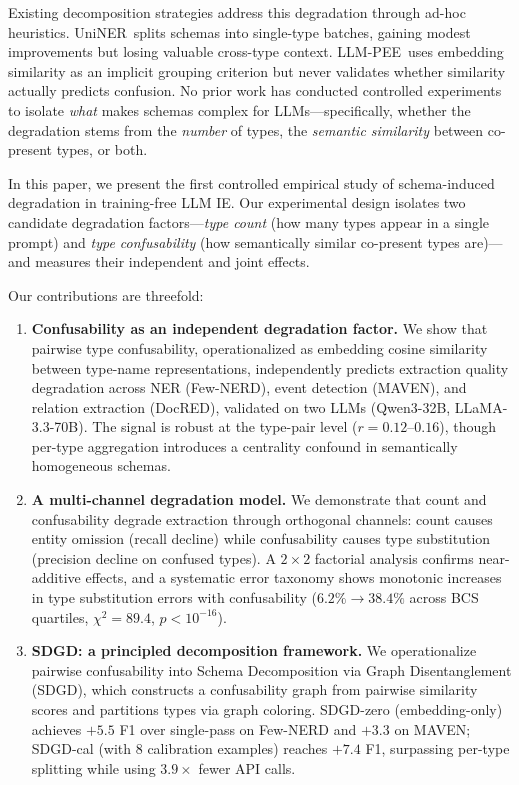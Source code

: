 \documentclass[11pt,a4paper]{article}
\begin{document}
Existing decomposition strategies address this degradation through ad-hoc heuristics.
UniNER~splits schemas into single-type batches, gaining modest improvements but losing valuable cross-type context.
LLM-PEE~uses embedding similarity as an implicit grouping criterion but never validates whether similarity actually predicts confusion.
No prior work has conducted controlled experiments to isolate \emph{what} makes schemas complex for LLMs---specifically, whether the degradation stems from the \emph{number} of types, the \emph{semantic similarity} between co-present types, or both.

In this paper, we present the first controlled empirical study of schema-induced degradation in training-free LLM IE.
Our experimental design isolates two candidate degradation factors---\emph{type count} (how many types appear in a single prompt) and \emph{type confusability} (how semantically similar co-present types are)---and measures their independent and joint effects.

Our contributions are threefold:
\begin{enumerate}
\item \textbf{Confusability as an independent degradation factor.}
We show that pairwise type confusability, operationalized as embedding cosine similarity between type-name representations, independently predicts extraction quality degradation across NER (Few-NERD), event detection (MAVEN), and relation extraction (DocRED), validated on two LLMs (Qwen3-32B, LLaMA-3.3-70B).
The signal is robust at the type-pair level ($r{=}0.12$--$0.16$), though per-type aggregation introduces a centrality confound in semantically homogeneous schemas.

\item \textbf{A multi-channel degradation model.}
We demonstrate that count and confusability degrade extraction through orthogonal channels: count causes entity omission (recall decline) while confusability causes type substitution (precision decline on confused types).
A $2{\times}2$ factorial analysis confirms near-additive effects, and a systematic error taxonomy shows monotonic increases in type substitution errors with confusability ($6.2\%{\to}38.4\%$ across BCS quartiles, $\chi^2{=}89.4$, $p{<}10^{-16}$).

\item \textbf{SDGD: a principled decomposition framework.}
We operationalize pairwise confusability into Schema Decomposition via Graph Disentanglement (SDGD), which constructs a confusability graph from pairwise similarity scores and partitions types via graph coloring.
SDGD-zero (embedding-only) achieves $+5.5$ F1 over single-pass on Few-NERD and $+3.3$ on MAVEN; SDGD-cal (with 8 calibration examples) reaches $+7.4$ F1, surpassing per-type splitting while using $3.9{\times}$ fewer API calls.
\end{enumerate}
\end{document}
